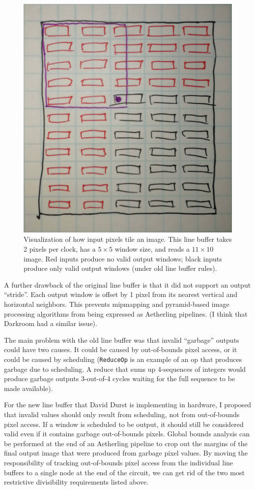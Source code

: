 \documentclass[12pt]{article}
\begin{document}
\begin{figure}
\centering
\includegraphics[width=0.5\linewidth]{Figures/old-lb-tiling.jpg}
\caption{Visualization of how input pixels tile an image. This line
buffer takes 2 pixels per clock, has a $5 \times 5$ window size,
and reads a $11 \times 10$ image. Red inputs produce no
valid output windows; black inputs produce only valid output windows
(under old line buffer rules).}
\label{old-lb-tiling.jpg}
\end{figure}

A further drawback of the original line buffer is that it did not
support an output ``stride''. Each output window is offset by 1 pixel
from its nearest vertical and horizontal neighbors. This prevents
mipmapping and pyramid-based image processing algorithms from being
expressed as Aetherling pipelines. (I think that Darkroom had a
similar issue).

The main problem with the old line buffer was that invalid ``garbage''
outputs could have two causes. It could be caused by out-of-bounds
pixel access, or it could be caused by scheduling (\texttt{ReduceOp}
is an example of an op that produces garbage due to scheduling. A
reduce that sums up 4-sequences of integers would produce garbage
outputs 3-out-of-4 cycles waiting for the full sequence to be made
available).

For the new line buffer that David Durst is implementing in hardware,
I proposed that invalid values should only result from scheduling, not
from out-of-bounds pixel access. If a window is scheduled to be
output, it should still be considered valid even if it contains
garbage out-of-bounds pixels. Global bounds analysis can be performed
at the end of an Aetherling pipeline to crop out the margins of the
final output image that were produced from garbage pixel values.  By
moving the responsibility of tracking out-of-bounds pixel access from
the individual line buffers to a single node at the end of the
circuit, we can get rid of the two most restrictive divisibility
requirements listed above.
\end{document}
